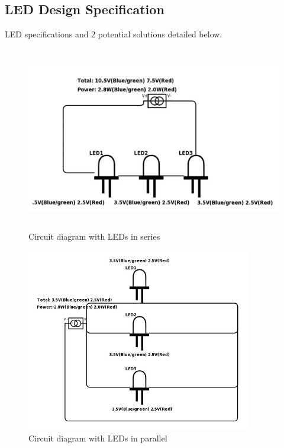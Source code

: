 \documentclass[12pt]{article}
\begin{document}
{{{{		\subsection{LED Design Specification}
		LED specifications and 2 potential solutions detailed below.
			\begin{figure}[!htb]
				\centering
				\includegraphics[height = 80mm]{assets/SeriesLED.jpg}
				\caption{Circuit diagram with LEDs in series \label{overflow}}
			\end{figure}
		
			\begin{figure}[!htb]
				\centering
				\includegraphics[height = 80mm]{assets/ParallelLED.jpg}
				\caption{Circuit diagram with LEDs in parallel \label{overflow}}
			\end{figure}
		
}}}}
\end{document}
